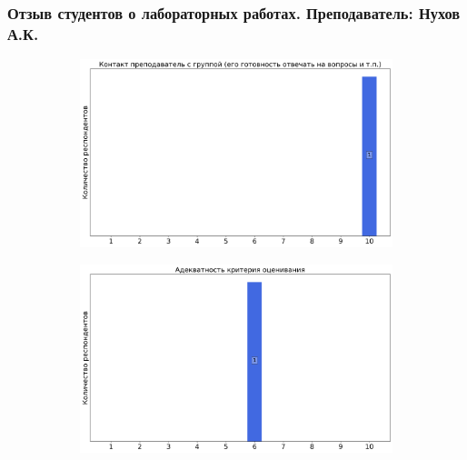 	\subsubsection{Отзыв студентов о лабораторных работах. Преподаватель: Нухов А.К.}
		\begin{figure}[H]
			\centering
			\begin{subfigure}[b]{0.45\textwidth}
				\centering
				\includegraphics[width=\textwidth]{images/2 course/Общая физика - электричество и магнетизм/labniks-marks-Нухов А.К.-0.png}
			\end{subfigure}
			\begin{subfigure}[b]{0.45\textwidth}
				\centering
				\includegraphics[width=\textwidth]{images/2 course/Общая физика - электричество и магнетизм/labniks-marks-Нухов А.К.-1.png}
			\end{subfigure}
			\begin{subfigure}[b]{0.45\textwidth}
				\centering

\end{subfigure}
\end{figure}
